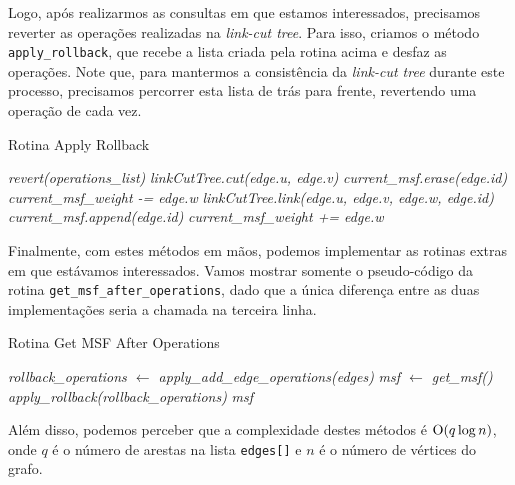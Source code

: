 Logo, após realizarmos as consultas em que estamos interessados, precisamos reverter as operações realizadas na \emph{link-cut tree}. Para isso, criamos o método \texttt{apply\_rollback}, que recebe a lista criada pela rotina acima e desfaz as operações. Note que, para mantermos a consistência da \emph{link-cut tree} durante este processo, precisamos percorrer esta lista de trás para frente, revertendo uma operação de cada vez.

\begin{algorithm}[h!]
    \caption{Rotina Apply Rollback}\label{imsf-apply-rollback}
    \begin{algorithmic}[1]
        \State \emph{revert(operations\_list)}
        \State \emph{linkCutTree.cut(edge.u, edge.v)}
        \State \emph{current\_msf.erase(edge.id)}
        \State \emph{current\_msf\_weight -= edge.w}
        \Else
        \State \emph{linkCutTree.link(edge.u, edge.v, edge.w, edge.id)}
        \State \emph{current\_msf.append(edge.id)}
        \State \emph{current\_msf\_weight += edge.w}
        \EndIf
        \EndFor
        \EndFunction
    \end{algorithmic}
\end{algorithm}

Finalmente, com estes métodos em mãos, podemos implementar as rotinas extras em que estávamos interessados. Vamos mostrar somente o pseudo-código da rotina \texttt{get\_msf\_after\_operations}, dado que a única diferença entre as duas implementações seria a chamada na terceira linha.

\begin{algorithm}[h!]
    \caption{Rotina Get MSF After Operations}\label{imsf-msf-after}
    \begin{algorithmic}[1]
        \State \emph{rollback\_operations $\gets$ apply\_add\_edge\_operations(edges)}
        \State \emph{msf $\gets$ get\_msf()}
        \State \emph{apply\_rollback(rollback\_operations)}
        \State \Return \emph{msf}
        \EndFunction
    \end{algorithmic}
\end{algorithm}

Além disso, podemos perceber que a complexidade destes métodos é $\mathrm{O}(q \log n)$, onde $q$ é o número de arestas na lista \texttt{edges[]} e $n$ é o número de vértices do grafo.

